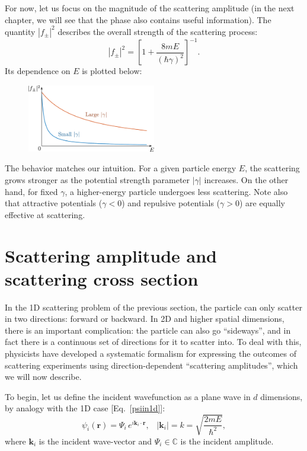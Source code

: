\documentclass[pra,12pt]{revtex4-2}
\begin{document}
For now, let us focus on the magnitude of the scattering amplitude (in
the next chapter, we will see that the phase also contains useful
information).  The quantity $|f_\pm|^2$ describes the overall strength
of the scattering process:
\begin{equation}
  |f_\pm|^2 = \left[1 + \frac{8mE}{(\hbar\gamma)^2}\right]^{-1}.
\end{equation}
Its dependence on $E$ is plotted below:

\begin{figure}[h]
  \centering\includegraphics[width=0.5\textwidth]{scattering1df}
\end{figure}

\noindent
The behavior matches our intuition.  For a given particle energy $E$,
the scattering grows stronger as the potential strength parameter
$|\gamma|$ increases.  On the other hand, for fixed $\gamma$, a
higher-energy particle undergoes less scattering.  Note also that
attractive potentials ($\gamma < 0$) and repulsive potentials ($\gamma
> 0$) are equally effective at scattering.

\section{Scattering amplitude and scattering cross section}
\label{sec:scattering_amplitude}

In the 1D scattering problem of the previous section, the particle can
only scatter in two directions: forward or backward.  In 2D and higher
spatial dimensions, there is an important complication: the particle
can also go ``sideways'', and in fact there is a continuous set of
directions for it to scatter into.  To deal with this, physicists have
developed a systematic formalism for expressing the outcomes of
scattering experiments using direction-dependent ``scattering
amplitudes'', which we will now describe.

To begin, let us define the incident wavefunction as a plane wave in
$d$ dimensions, by analogy with the 1D case [Eq.~\eqref{psiin1d}]:
\begin{equation}
  \psi_i(\mathbf{r}) = \Psi_i \, e^{i\mathbf{k}_i\cdot\mathbf{r}},
  \;\;\; |\mathbf{k}_i| = k = \sqrt{\frac{2mE}{\hbar^2}},
  \label{psiin}
\end{equation}
where $\mathbf{k}_i$ is the incident wave-vector and $\Psi_i \in
\mathbb{C}$ is the incident amplitude.
\end{document}
